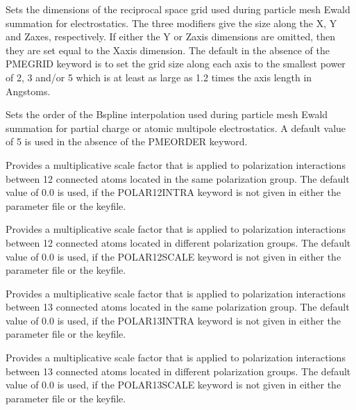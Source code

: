\documentclass[letterpaper,11pt,english]{sphinxmanual}
\begin{document}
  Sets the dimensions of the reciprocal space grid used during particle mesh Ewald summation for electrostatics. The three modifiers give the size along the X\sphinxhyphen{}, Y\sphinxhyphen{} and Z\sphinxhyphen{}axes, respectively. If either the Y\sphinxhyphen{} or Z\sphinxhyphen{}axis dimensions are omitted, then they are set equal to the X\sphinxhyphen{}axis dimension. The default in the absence of the PME\sphinxhyphen{}GRID keyword is to set the grid size along each axis to the smallest power of 2, 3 and/or 5 which is at least as large as 1.2 times the axis length in Angstoms.

  Sets the order of the B\sphinxhyphen{}spline interpolation used during particle mesh Ewald summation for partial charge or atomic multipole electrostatics. A default value of 5 is used in the absence of the PME\sphinxhyphen{}ORDER keyword.

  Provides a multiplicative scale factor that is applied to polarization interactions between 1\sphinxhyphen{}2 connected atoms located in the same polarization group. The default value of 0.0 is used, if the POLAR\sphinxhyphen{}12\sphinxhyphen{}INTRA keyword is not given in either the parameter file or the keyfile.

  Provides a multiplicative scale factor that is applied to polarization interactions between 1\sphinxhyphen{}2 connected atoms located in different polarization groups. The default value of 0.0 is used, if the POLAR\sphinxhyphen{}12\sphinxhyphen{}SCALE keyword is not given in either the parameter file or the keyfile.

  Provides a multiplicative scale factor that is applied to polarization interactions between 1\sphinxhyphen{}3 connected atoms located in the same polarization group. The default value of 0.0 is used, if the POLAR\sphinxhyphen{}13\sphinxhyphen{}INTRA keyword is not given in either the parameter file or the keyfile.

  Provides a multiplicative scale factor that is applied to polarization interactions between 1\sphinxhyphen{}3 connected atoms located in different polarization groups. The default value of 0.0 is used, if the POLAR\sphinxhyphen{}13\sphinxhyphen{}SCALE keyword is not given in either the parameter file or the keyfile.
\end{document}
